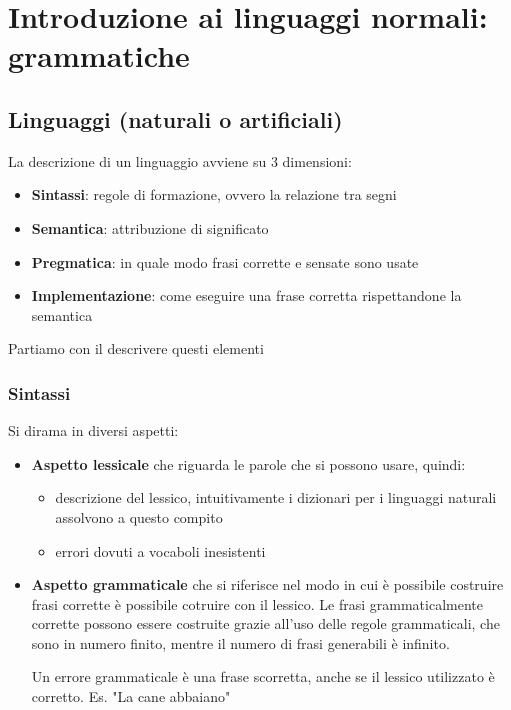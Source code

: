 \chapter{Introduzione ai linguaggi normali: grammatiche}


\section{Linguaggi (naturali o artificiali)}

La descrizione di un linguaggio avviene su 3 dimensioni:
\begin{itemize}
    \item \textbf{Sintassi}: regole di formazione, ovvero la relazione tra segni
    \item \textbf{Semantica}: attribuzione di significato
    \item \textbf{Pregmatica}: in quale modo frasi corrette e sensate sono usate
    \item \textbf{Implementazione}: come eseguire una frase corretta rispettandone la semantica
\end{itemize}

Partiamo con il descrivere questi elementi

\subsection{Sintassi}



Si dirama in diversi aspetti: 
\begin{itemize}
    \item \textbf{Aspetto lessicale} che riguarda le parole che si possono usare, quindi:
    \begin{itemize}
        \item descrizione del lessico, intuitivamente i dizionari per i linguaggi naturali assolvono a questo compito
        \item errori dovuti a vocaboli inesistenti
    \end{itemize}
    \item \textbf{Aspetto grammaticale} che si riferisce nel modo in cui è possibile costruire frasi corrette è possibile cotruire con il lessico. Le frasi grammaticalmente corrette possono essere costruite grazie all'uso delle regole grammaticali, che sono in numero finito, mentre il numero di frasi generabili è infinito.
    
    Un errore grammaticale è una frase scorretta, anche se il lessico utilizzato è corretto. Es. "La cane abbaiano"
\end{itemize}

